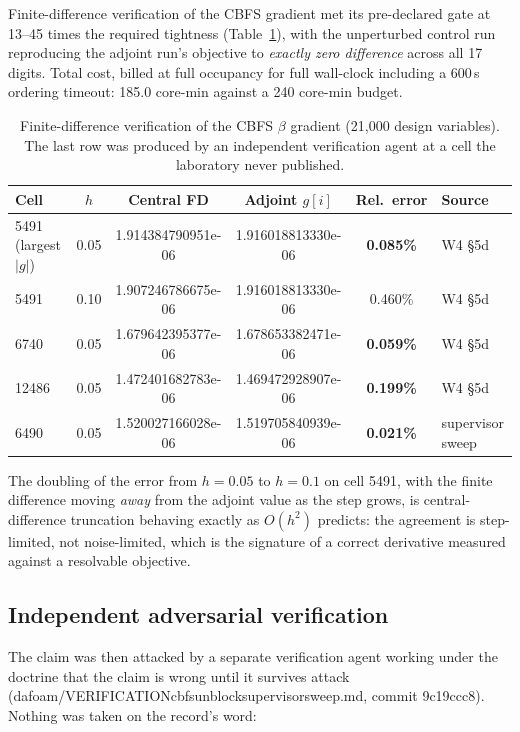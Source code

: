 \documentclass[11pt,a4paper]{article}
\newcommand{\breakus}{\textunderscore\allowbreak}
\newcommand{\code}[1]{{\small\ttfamily\let\_\breakus #1}}
\newcommand{\artifact}[1]{{\footnotesize\ttfamily\let\_\breakus #1}}
\begin{document}
Finite-difference verification of the CBFS gradient met its pre-declared gate at 13--45
times the required tightness (Table~\ref{tab:fd}), with the unperturbed control run
reproducing the adjoint run's objective to \emph{exactly zero difference} across all 17
digits. Total cost, billed at full occupancy for full wall-clock including a 600\,s ordering
timeout: 185.0 core-min against a 240 core-min budget.

\begin{table}[h]
\centering
\small
\caption{Finite-difference verification of the CBFS $\beta$ gradient (21{,}000 design
variables). The last row was produced by an independent verification agent at a cell the
laboratory never published.}
\label{tab:fd}
\begin{tabular}{lccccl}
\toprule
Cell & $h$ & Central FD & Adjoint $g[i]$ & Rel.\ error & Source \\
\midrule
5491 (largest $|g|$) & 0.05 & 1.914384790951e-06 & 1.916018813330e-06 & \textbf{0.085\%} & W4 \S5d \\
5491                 & 0.10 & 1.907246786675e-06 & 1.916018813330e-06 & 0.460\% & W4 \S5d \\
6740                 & 0.05 & 1.679642395377e-06 & 1.678653382471e-06 & \textbf{0.059\%} & W4 \S5d \\
12486                & 0.05 & 1.472401682783e-06 & 1.469472928907e-06 & \textbf{0.199\%} & W4 \S5d \\
6490                 & 0.05 & 1.520027166028e-06 & 1.519705840939e-06 & \textbf{0.021\%} & supervisor sweep \\
\bottomrule
\end{tabular}
\end{table}

The doubling of the error from $h = 0.05$ to $h = 0.1$ on cell 5491, with the finite
difference moving \emph{away} from the adjoint value as the step grows, is
central-difference truncation behaving exactly as $O(h^2)$ predicts: the agreement is
step-limited, not noise-limited, which is the signature of a correct derivative measured
against a resolvable objective.

\subsection{Independent adversarial verification}

The claim was then attacked by a separate verification agent working under the doctrine
that the claim is wrong until it survives attack
(\artifact{dafoam/VERIFICATION\_cbfs\_unblock\_supervisor\_sweep.md},
commit \code{9c19ccc8}). Nothing was taken on the record's word:
\end{document}
